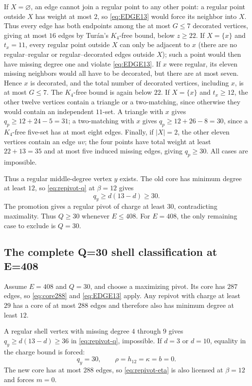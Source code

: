If $X=\varnothing$, an edge cannot join a regular point to any other point: a regular point outside $X$ has weight at most $2$, so \cref{eq:EDGE13} would force its neighbor into $X$. Thus every edge has both endpoints among the at most $G\leq7$ decorated vertices, giving at most $16$ edges by Tur\'an's $K_4$-free bound, below $z\geq22$. If $X=\{x\}$ and $t_x=11$, every regular point outside $X$ can only be adjacent to $x$ (there are no regular--regular or regular--decorated edges outside $X$); such a point would then have missing degree one and violate \cref{eq:EDGE13}. If $x$ were regular, its eleven missing neighbors would all have to be decorated, but there are at most seven. Hence $x$ is decorated, and the total number of decorated vertices, including $x$, is at most $G\leq7$. The $K_4$-free bound is again below $22$. If $X=\{x\}$ and $t_x\geq12$, the other twelve vertices contain a triangle or a two-matching, since otherwise they would contain an independent $11$-set. A triangle with $x$ gives $q_p\geq12+24-5=31$; a two-matching with $x$ gives $q_p\geq12+26-8=30$, since a $K_4$-free five-set has at most eight edges. Finally, if $|X|=2$, the other eleven vertices contain an edge $uv$; the four points have total weight at least $22+13=35$ and at most five induced missing edges, giving $q_p\geq30$. All cases are impossible.

Thus a regular middle-degree vertex $y$ exists. The old core has minimum degree at least $12$, so \cref{eq:repivot-q} at $\beta=12$ gives
\[
q_y\geq d(13-d)\geq30.
\]
The promotion gives a regular pivot of charge at least $30$, contradicting maximality. Thus $Q\geq30$ whenever $E\leq408$. For $E=408$, the only remaining case to exclude is $Q=30$.

\subsection{The complete Q=30 shell classification at E=408}

Assume $E=408$ and $Q=30$, and choose a maximizing pivot. Its core has $287$ edges, so \cref{eq:core288} and \cref{eq:EDGE13} apply. Any repivot with charge at least $29$ has a core of at most $288$ edges and therefore also has minimum degree at least $12$.

A regular shell vertex with missing degree $4$ through $9$ gives $q_y\geq d(13-d)\geq36$ in \cref{eq:repivot-q}, impossible. If $d=3$ or $d=10$, equality in the charge bound is forced:
\[
q_y=30,\qquad \rho=h_{12}=\kappa=b=0.
\]
The new core has at most $288$ edges, so \cref{eq:repivot-eta} is also licensed at $\beta=12$ and forces $m=0$.

